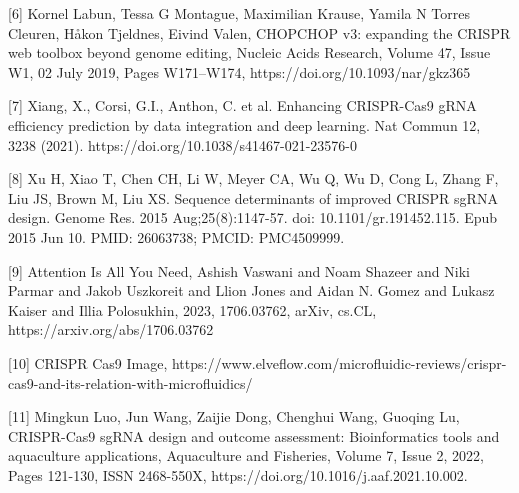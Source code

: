 \documentclass{article}
\begin{document}
\label{Reference 6} [6] Kornel Labun, Tessa G Montague, Maximilian Krause, Yamila N Torres Cleuren, Håkon Tjeldnes, Eivind Valen, CHOPCHOP v3: expanding the CRISPR web toolbox beyond genome editing, Nucleic Acids Research, Volume 47, Issue W1, 02 July 2019, Pages W171–W174, https://doi.org/10.1093/nar/gkz365

\label{Reference 7} [7] Xiang, X., Corsi, G.I., Anthon, C. et al. Enhancing CRISPR-Cas9 gRNA efficiency prediction by data integration and deep learning. Nat Commun 12, 3238 (2021). https://doi.org/10.1038/s41467-021-23576-0

\label{Reference 8} [8] Xu H, Xiao T, Chen CH, Li W, Meyer CA, Wu Q, Wu D, Cong L, Zhang F, Liu JS, Brown M, Liu XS. Sequence determinants of improved CRISPR sgRNA design. Genome Res. 2015 Aug;25(8):1147-57. doi: 10.1101/gr.191452.115. Epub 2015 Jun 10. PMID: 26063738; PMCID: PMC4509999. 

\label{Reference 9} [9] Attention Is All You Need, Ashish Vaswani and Noam Shazeer and Niki Parmar and Jakob Uszkoreit and Llion Jones and Aidan N. Gomez and Lukasz Kaiser and Illia Polosukhin, 2023, 1706.03762, arXiv, cs.CL, https://arxiv.org/abs/1706.03762

\label{Reference 10} [10] CRISPR Cas9 Image, https://www.elveflow.com/microfluidic-reviews/crispr-cas9-and-its-relation-with-microfluidics/

\label{Reference 11} [11] Mingkun Luo, Jun Wang, Zaijie Dong, Chenghui Wang, Guoqing Lu, CRISPR-Cas9 sgRNA design and outcome assessment: Bioinformatics tools and aquaculture applications, Aquaculture and Fisheries, Volume 7, Issue 2, 2022, Pages 121-130, ISSN 2468-550X, https://doi.org/10.1016/j.aaf.2021.10.002.
\end{document}
